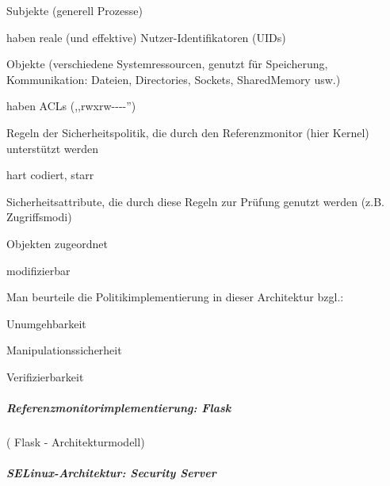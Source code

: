 \documentclass[a4paper]{article}
\begin{document}
\begin{multicols}{3}
    \begin{itemize*}
        \item
        Subjekte (generell Prozesse)
        \begin{itemize*}
            \item haben reale (und effektive) Nutzer-Identifikatoren (UIDs)
        \end{itemize*}
        \item
        Objekte (verschiedene Systemressourcen, genutzt für Speicherung,
        Kommunikation: Dateien, Directories, Sockets, SharedMemory usw.)
        \begin{itemize*}
            \item haben ACLs (,,rwxrw-\/-\/-\/-'')
        \end{itemize*}
        \item
        Regeln der Sicherheitspolitik, die durch den Referenzmonitor (hier
        Kernel) unterstützt werden
        \begin{itemize*}
            \item hart codiert, starr
        \end{itemize*}
        \item
        Sicherheitsattribute, die durch diese Regeln zur Prüfung genutzt
        werden (z.B. Zugriffsmodi)
        \begin{itemize*}
            \item Objekten zugeordnet
            \item modifizierbar
        \end{itemize*}
    \end{itemize*}

    Man beurteile die Politikimplementierung in dieser Architektur bzgl.:

    \begin{itemize*}
        \item
        Unumgehbarkeit
        \item
        Manipulationssicherheit
        \item
        Verifizierbarkeit
    \end{itemize*}


    \subparagraph{Referenzmonitorimplementierung:
        Flask}

    ( Flask - Architekturmodell)



    \subparagraph{SELinux-Architektur: Security
        Server}


\end{multicols}
\end{document}
